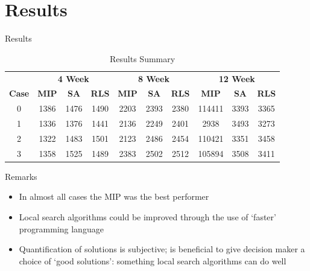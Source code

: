 \documentclass{beamer}
\begin{document}
\section{Results}
\begin{frame}{Results}
    \begin{table}[H]
        \centering
        \caption{Results Summary}
        \label{fig:results}
        \begin{tabular}{cccccccccc}
            \toprule
            & \multicolumn{3}{c}{\textbf{4 Week}} & \multicolumn{3}{c}{\textbf{8 Week}} & \multicolumn{3}{c}{\textbf{12 Week}} \\
            \cmidrule(lr){2-4}\cmidrule(lr){5-7}\cmidrule(lr){8-10}
            \textbf{Case}      & \textbf{MIP}       & \textbf{SA}       & \textbf{RLS}      & \textbf{MIP}           & \textbf{SA}           & \textbf{RLS}          & \textbf{MIP}           & \textbf{SA}           & \textbf{RLS}          \\
            \cmidrule(lr){1-1}\cmidrule(lr){2-4}\cmidrule(lr){5-7}\cmidrule(lr){8-10}
            0         & 1386      & 1476     & 1490     & 2203          & 2393         & 2380         & 114411        & 3393         & 3365         \\
            1         & 1336      & 1376     & 1441     & 2136          & 2249         & 2401         & 2938          & 3493         & 3273         \\
            2         & 1322      & 1483     & 1501     & 2123          & 2486         & 2454         & 110421        & 3351         & 3458        \\
            3         & 1358      & 1525     & 1489     & 2383          & 2502         & 2512         & 105894        & 3508         & 3411         \\ \bottomrule
        \end{tabular}
    \end{table}
\end{frame}

\begin{frame}{Remarks}
    \begin{itemize}
        \item In almost all cases the MIP was the best performer
        \item Local search algorithms could be improved through the use of `faster' programming language
        \item Quantification of solutions is subjective; is beneficial to give decision maker a choice of `good solutions': something local search algorithms can do well
    \end{itemize}
\end{frame}
\end{document}
